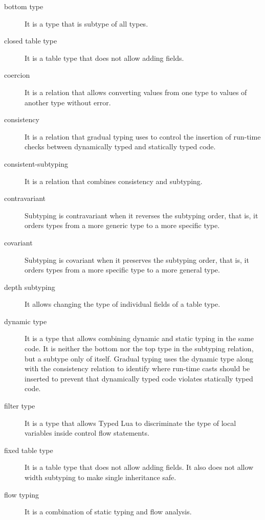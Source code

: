 \begin{description}
\item[bottom type] It is a type that is subtype of all types.

\item[closed table type] It is a table type that does not allow adding fields.

\item[coercion] It is a relation that allows converting values from one type to values
of another type without error.

\item[consistency] It is a relation that gradual typing uses to control the insertion of
run-time checks between dynamically typed and statically typed code.

\item[consistent-subtyping] It is a relation that combines consistency and subtyping.

\item[contravariant] Subtyping is contravariant when it reverses the subtyping order,
that is, it orders types from a more generic type to a more specific type.

\item[covariant] Subtyping is covariant when it preserves the subtyping order,
that is, it orders types from a more specific type to a more general type.

\item[depth subtyping] It allows changing the type of individual fields of a table type.

\item[dynamic type] It is a type that allows combining dynamic and static typing in the same code.
It is neither the bottom nor the top type in the subtyping relation, but
a subtype only of itself.
Gradual typing uses the dynamic type along with the consistency relation to
identify where run-time casts should be inserted to prevent that dynamically
typed code violates statically typed code.

\item[filter type] It is a type that allows Typed Lua to discriminate the type of local variables
inside control flow statements.

\item[fixed table type] It is a table type that does not allow adding fields. It also does not allow
width subtyping to make single inheritance safe.

\item[flow typing] It is a combination of static typing and flow analysis.


\end{description}
